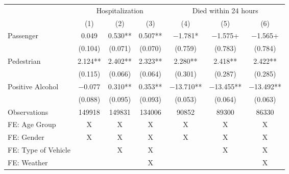 
\begin{tabular}[t]{lcccccc}
\toprule
\multicolumn{1}{c}{ } & \multicolumn{3}{c}{Hospitalization} & \multicolumn{3}{c}{Died within 24 hours} \\
\cmidrule(l{3pt}r{3pt}){2-4} \cmidrule(l{3pt}r{3pt}){5-7}
  & (1) & (2) & (3) & (4) & (5) & (6)\\
\midrule
Passenger & \num{0.049} & \num{0.530}** & \num{0.507}** & \num{-1.781}* & \num{-1.575}+ & \num{-1.565}+\\
 & (\num{0.104}) & (\num{0.071}) & (\num{0.070}) & (\num{0.759}) & (\num{0.783}) & (\num{0.784})\\
Pedestrian & \num{2.124}** & \num{2.402}** & \num{2.323}** & \num{2.280}** & \num{2.418}** & \num{2.422}**\\
 & (\num{0.115}) & (\num{0.066}) & (\num{0.064}) & (\num{0.301}) & (\num{0.287}) & (\num{0.285})\\
Positive Alcohol & \num{-0.077} & \num{0.310}** & \num{0.353}** & \num{-13.710}** & \num{-13.455}** & \num{-13.492}**\\
 & (\num{0.088}) & (\num{0.095}) & (\num{0.093}) & (\num{0.053}) & (\num{0.064}) & (\num{0.063})\\
\midrule
Observations & \num{149918} & \num{149831} & \num{134006} & \num{90852} & \num{89300} & \num{86330}\\
\midrule
FE: Age Group & X & X & X & X & X & X\\
FE: Gender & X & X & X & X & X & X\\
FE: Type of Vehicle &  & X & X &  & X & X\\
FE: Weather &  &  & X &  &  & X\\
\bottomrule
\end{tabular}

